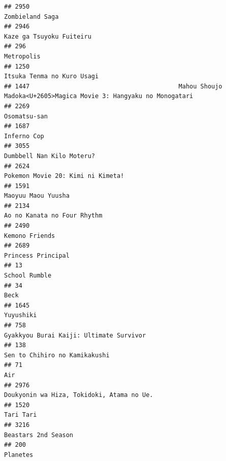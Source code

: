 \documentclass[
]{article}
\begin{document}
\begin{verbatim}
## 2950                                                                                           Zombieland Saga
## 2946                                                                                  Kaze ga Tsuyoku Fuiteiru
## 296                                                                                                 Metropolis
## 1250                                                                                Itsuka Tenma no Kuro Usagi
## 1447                                         Mahou Shoujo Madoka<U+2605>Magica Movie 3: Hangyaku no Monogatari
## 2269                                                                                              Osomatsu-san
## 1687                                                                                               Inferno Cop
## 3055                                                                                 Dumbbell Nan Kilo Moteru?
## 2624                                                                         Pokemon Movie 20: Kimi ni Kimeta!
## 1591                                                                                        Maoyuu Maou Yuusha
## 2134                                                                               Ao no Kanata no Four Rhythm
## 2490                                                                                            Kemono Friends
## 2689                                                                                        Princess Principal
## 13                                                                                               School Rumble
## 34                                                                                                        Beck
## 1645                                                                                                 Yuyushiki
## 758                                                                    Gyakkyou Burai Kaiji: Ultimate Survivor
## 138                                                                              Sen to Chihiro no Kamikakushi
## 71                                                                                                         Air
## 2976                                                                 Doukyonin wa Hiza, Tokidoki, Atama no Ue.
## 1520                                                                                                 Tari Tari
## 3216                                                                                       Beastars 2nd Season
## 200                                                                                                   Planetes

\end{verbatim}
\end{document}
